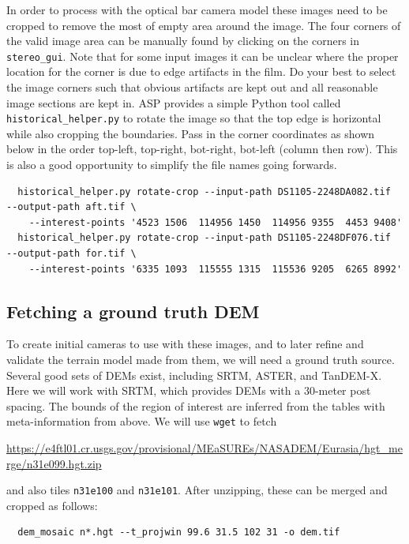 In order to process with the optical bar camera model these images need to be cropped
to remove the most of empty area around the image.  The four corners of the valid image 
area can be manually found by clicking on the corners in \texttt{stereo\_gui}.  Note that
for some input images it can be unclear where the proper location for the corner is due to
edge artifacts in the film.  Do your best to select the image corners such that obvious
artifacts are kept out and all reasonable image sections are kept in.
ASP provides a simple Python tool called \texttt{historical\_helper.py} to rotate the image so that the top edge is horizontal
while also cropping the boundaries.  Pass in the corner coordinates as shown below
in the order top-left, top-right, bot-right, bot-left (column then row).
This is also a good opportunity to simplify the file names going forwards.

\begin{verbatim}
  historical_helper.py rotate-crop --input-path DS1105-2248DA082.tif  --output-path aft.tif \
    --interest-points '4523 1506  114956 1450  114956 9355  4453 9408'
  historical_helper.py rotate-crop --input-path DS1105-2248DF076.tif  --output-path for.tif \
    --interest-points '6335 1093  115555 1315  115536 9205  6265 8992'
\end{verbatim}

\subsection{Fetching a ground truth DEM}

To create initial cameras to use with these images, and to later refine and validate
the terrain model made from them, we will need a ground truth source. 
Several good sets of DEMs exist, including SRTM, ASTER, and TanDEM-X. Here we will
work with SRTM, which provides DEMs with a 30-meter post spacing. The bounds of the region 
of interest are inferred from the tables with meta-information from above. 
We will use \texttt{wget} to fetch
\begin{center}
\url{https://e4ftl01.cr.usgs.gov/provisional/MEaSUREs/NASADEM/Eurasia/hgt_merge/n31e099.hgt.zip}
\end{center}
and also tiles \texttt{n31e100} and \texttt{n31e101}. After unzipping, these can be
merged and cropped as follows:

\begin{verbatim}
  dem_mosaic n*.hgt --t_projwin 99.6 31.5 102 31 -o dem.tif
\end{verbatim}

